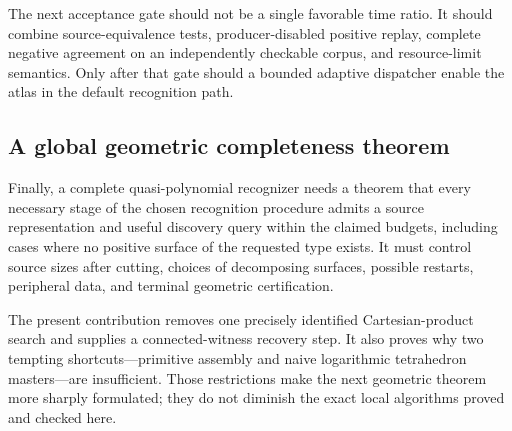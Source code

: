 The next acceptance gate should not be a single favorable time ratio. It should combine source-equivalence tests, producer-disabled positive replay, complete negative agreement on an independently checkable corpus, and resource-limit semantics. Only after that gate should a bounded adaptive dispatcher enable the atlas in the default recognition path.

\subsection{A global geometric completeness theorem}
Finally, a complete quasi-polynomial recognizer needs a theorem that every necessary stage of the chosen recognition procedure admits a source representation and useful discovery query within the claimed budgets, including cases where no positive surface of the requested type exists. It must control source sizes after cutting, choices of decomposing surfaces, possible restarts, peripheral data, and terminal geometric certification.

The present contribution removes one precisely identified Cartesian-product search and supplies a connected-witness recovery step. It also proves why two tempting shortcuts---primitive assembly and naive logarithmic tetrahedron masters---are insufficient. Those restrictions make the next geometric theorem more sharply formulated; they do not diminish the exact local algorithms proved and checked here.
